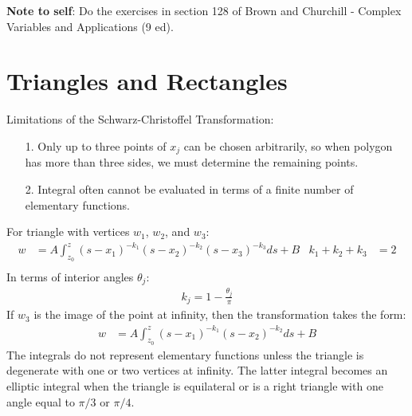 \documentclass[12pt, english]{book}
\begin{document}
	{\color{Red} \textbf{Note to self}: Do the exercises in section 128 of Brown and Churchill - Complex Variables and Applications (9 ed).}
	
	\section{Triangles and Rectangles} \label{Triangles and Rectangls Section - Complex}
	
	Limitations of the Schwarz-Christoffel Transformation:
	\begin{itemize}
		\item[1.] Only up to three points of \(x_j\) can be chosen arbitrarily, so when polygon has more than three sides, we must determine the remaining points.
		\item[2.] Integral often cannot be evaluated in terms of a finite number of elementary functions.
	\end{itemize}

	For triangle with vertices \(w_1\), \(w_2\), and \(w_3\):
	\begin{align*}
		w &= A \int_{z_0}^{z} (s-x_1)^{-k_1} (s-x_2)^{-k_2} (s-x_3)^{-k_3} ds + B &
		k_1 + k_2 + k_3 &= 2 \\
	\end{align*}
	In terms of interior angles \(\theta_j\):
	\begin{align*}
		k_j = 1 - \frac{\theta_j}{\pi}
	\end{align*}
	If \(w_3\) is the image of the point at infinity, then the transformation takes the form:
	\begin{align*}
		w &= A \int_{z_0}^{z} (s-x_1)^{-k_1} (s-x_2)^{-k_2} ds + B
	\end{align*}
	The integrals do not represent elementary functions unless the triangle is degenerate with one or two vertices at infinity. The latter integral becomes an elliptic integral when the triangle is equilateral or is a right triangle with one angle equal to \(\pi/3\) or \(\pi/4\).
	
\end{document}
